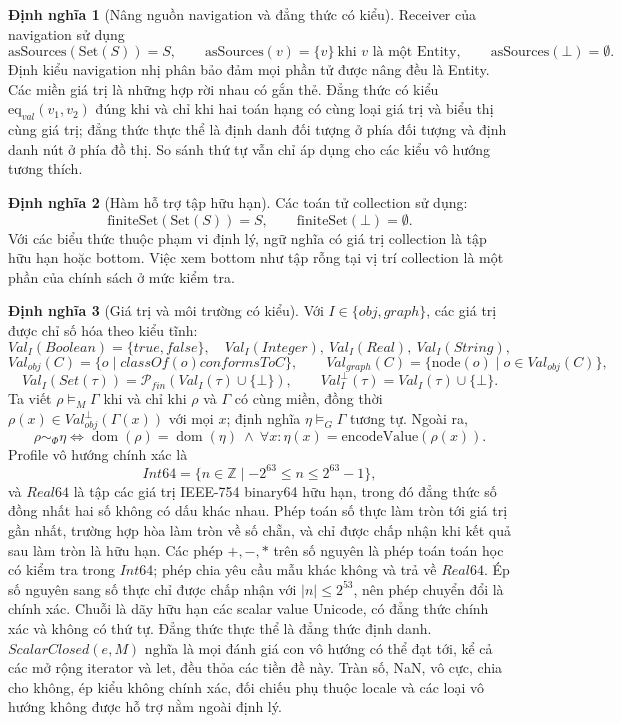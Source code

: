 \documentclass[11pt,a4paper]{article}
\theoremstyle{definition}
\newtheorem{definition}{Định nghĩa}
\newcommand{\node}{\mathrm{node}}
\newcommand{\finiteSet}{\mathrm{finiteSet}}
\newcommand{\asSources}{\mathrm{asSources}}
\newcommand{\eqval}{\mathrm{eq}_{val}}
\newcommand{\encodeValue}{\mathrm{encodeValue}}
\begin{document}
\begin{definition}[Nâng nguồn navigation và đẳng thức có kiểu]
Receiver của navigation sử dụng
\[
\asSources(\mathrm{Set}(S))=S,\qquad
\asSources(v)=\{v\}\ \text{khi }v\text{ là một Entity},\qquad
\asSources(\bot)=\emptyset.
\]
Định kiểu navigation nhị phân bảo đảm mọi phần tử được nâng đều là Entity.
Các miền giá trị là những hợp rời nhau có gắn thẻ. Đẳng thức có kiểu
$\eqval(v_1,v_2)$ đúng khi và chỉ khi hai toán hạng có cùng loại giá trị và biểu
thị cùng giá trị; đẳng thức thực thể là định danh đối tượng ở phía đối tượng và
định danh nút ở phía đồ thị. So sánh thứ tự vẫn chỉ áp dụng cho các kiểu vô
hướng tương thích.
\end{definition}

\begin{definition}[Hàm hỗ trợ tập hữu hạn]
Các toán tử collection sử dụng:
\[
\finiteSet(\mathrm{Set}(S))=S,\qquad
\finiteSet(\bot)=\emptyset.
\]
Với các biểu thức thuộc phạm vi định lý, ngữ nghĩa có giá trị collection là tập
hữu hạn hoặc bottom. Việc xem bottom như tập rỗng tại vị trí collection là một
phần của chính sách ở mức kiểm tra.
\end{definition}

\begin{definition}[Giá trị và môi trường có kiểu]
Với $I\in\{obj,graph\}$, các giá trị được chỉ số hóa theo kiểu tĩnh:
\[
Val_I(Boolean)=\{true,false\},\quad
Val_I(Integer),\ Val_I(Real),\ Val_I(String),
\]
\[
Val_{obj}(C)=\{o\mid classOf(o)\mathrel{conformsTo}C\},\qquad
Val_{graph}(C)=\{\node(o)\mid o\in Val_{obj}(C)\},
\]
\[
Val_I(Set(\tau))=\mathcal P_{fin}(Val_I(\tau)\cup\{\bot\}),\qquad
Val_I^\bot(\tau)=Val_I(\tau)\cup\{\bot\}.
\]
Ta viết $\rho\models_M\Gamma$ khi và chỉ khi $\rho$ và $\Gamma$ có cùng miền,
đồng thời $\rho(x)\in Val_{obj}^\bot(\Gamma(x))$ với mọi $x$; định nghĩa
$\eta\models_G\Gamma$ tương tự. Ngoài ra,
\[
\rho\sim_\Phi\eta\iff
\operatorname{dom}(\rho)=\operatorname{dom}(\eta)\ \land\
\forall x:\eta(x)=\encodeValue(\rho(x)).
\]
Profile vô hướng chính xác là
\[
Int64=\{n\in\mathbb Z\mid -2^{63}\le n\le 2^{63}-1\},
\]
và $Real64$ là tập các giá trị IEEE-754 binary64 hữu hạn, trong đó đẳng thức số
đồng nhất hai số không có dấu khác nhau. Phép toán số thực làm tròn tới giá trị
gần nhất, trường hợp hòa làm tròn về số chẵn, và chỉ được chấp nhận khi kết quả
sau làm tròn là hữu hạn. Các phép $+,-,*$ trên số nguyên là phép toán toán học
có kiểm tra trong $Int64$; phép chia yêu cầu mẫu khác không và trả về $Real64$.
Ép số nguyên sang số thực chỉ được chấp nhận với $|n|\le 2^{53}$, nên phép
chuyển đổi là chính xác. Chuỗi là dãy hữu hạn các scalar value Unicode, có đẳng
thức chính xác và không có thứ tự. Đẳng thức thực thể là đẳng thức định danh.
$ScalarClosed(e,M)$ nghĩa là mọi đánh giá con vô hướng có thể đạt tới, kể cả
các mở rộng iterator và let, đều thỏa các tiền đề này. Tràn số, NaN, vô cực,
chia cho không, ép kiểu không chính xác, đối chiếu phụ thuộc locale và các loại
vô hướng không được hỗ trợ nằm ngoài định lý.
\end{definition}
\end{document}
